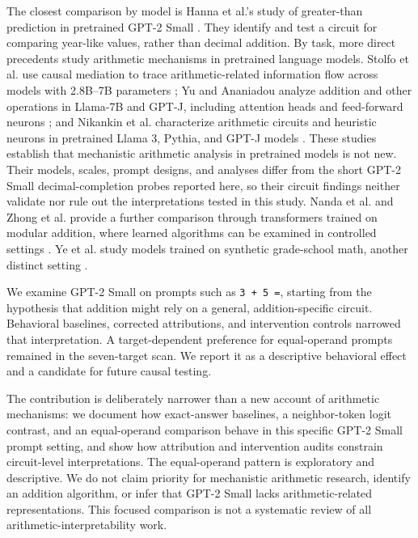 \documentclass[11pt]{article}
\begin{document}
The closest comparison by model is Hanna et al.'s study of greater-than prediction in pretrained GPT-2 Small \cite{hanna2023greater}. They identify and test a circuit for comparing year-like values, rather than decimal addition. By task, more direct precedents study arithmetic mechanisms in pretrained language models. Stolfo et al. use causal mediation to trace arithmetic-related information flow across models with 2.8B--7B parameters \cite{stolfo2023causal}; Yu and Ananiadou analyze addition and other operations in Llama-7B and GPT-J, including attention heads and feed-forward neurons \cite{yu2024cna}; and Nikankin et al. characterize arithmetic circuits and heuristic neurons in pretrained Llama 3, Pythia, and GPT-J models \cite{nikankin2025heuristics}. These studies establish that mechanistic arithmetic analysis in pretrained models is not new. Their models, scales, prompt designs, and analyses differ from the short GPT-2 Small decimal-completion probes reported here, so their circuit findings neither validate nor rule out the interpretations tested in this study. Nanda et al. and Zhong et al. provide a further comparison through transformers trained on modular addition, where learned algorithms can be examined in controlled settings \cite{nanda2023progress,zhong2023clock}. Ye et al. study models trained on synthetic grade-school math, another distinct setting \cite{ye2024physics}.

We examine GPT-2 Small on prompts such as \texttt{3 + 5 =}, starting from the hypothesis that addition might rely on a general, addition-specific circuit. Behavioral baselines, corrected attributions, and intervention controls narrowed that interpretation. A target-dependent preference for equal-operand prompts remained in the seven-target scan. We report it as a descriptive behavioral effect and a candidate for future causal testing.

The contribution is deliberately narrower than a new account of arithmetic mechanisms: we document how exact-answer baselines, a neighbor-token logit contrast, and an equal-operand comparison behave in this specific GPT-2 Small prompt setting, and show how attribution and intervention audits constrain circuit-level interpretations. The equal-operand pattern is exploratory and descriptive. We do not claim priority for mechanistic arithmetic research, identify an addition algorithm, or infer that GPT-2 Small lacks arithmetic-related representations. This focused comparison is not a systematic review of all arithmetic-interpretability work.
\end{document}
